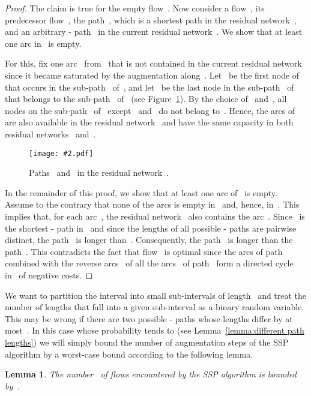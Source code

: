 \documentclass[11pt]{article}
\newtheorem{lemma}[theorem]{Lemma}
\newcommand{\GFX}[2][]{\texttt{[image: \#2.pdf]}}
\newenvironment{fig}
{\begin{figure}[th]\begin{center}}
{\end{center}\end{figure}}
\newenvironment{GFXFIG}[2][]
{\begin{fig}\GFX[#1]{#2}}
{\end{fig}}
\begin{document}
\begin{proof}\renewcommand{\P}{P'}
The claim is true for the empty flow~. Now consider a flow~, its predecessor flow~, the path~, which is a shortest path in the residual network~, and an arbitrary - path~ in the current residual network~. We show that at least one arc in~ is empty.

For this, fix one arc~ from~ that is not contained in the current residual network~ since it became saturated by the augmentation along~. Let~ be the first node of~ that occurs in the sub-path~ of~, and let~ be the last node in the sub-path~ of~ that belongs to the sub-path~ of~ (see Figure~\ref{fig:one empty arc}). By the choice of~ and~, all nodes on the sub-path~ of~ except~ and~ do not belong to~. Hence, the arcs of~ are also available in the residual network~ and have
the same capacity in both residual networks~ and~.

\begin{GFXFIG}[width=0.6\textwidth]{OneEmptyArc}
\caption{Paths~ and~ in the residual network~.}
\label{fig:one empty arc}
\end{GFXFIG}

In the remainder of this proof,
we show that at least one arc of~ is empty. Assume to the contrary
that none of the arcs is empty in~ and, hence, in~. This implies that, for each arc~, the residual network~ also contains the arc~. Since~ is the shortest - path in~ and since the lengths of all possible - paths are pairwise distinct, the path~ is longer than~. Consequently, the path~ is longer than the path~. This contradicts the fact that flow~ is optimal since the arcs of path~ combined with the reverse arcs~ of all the arcs~ of path~ form a directed cycle~ in~ of negative costs. \end{proof}

We want to partition the interval  into small sub-intervals of length~ and treat the number of lengths  that fall into a given sub-interval as a binary random variable. This may be wrong if there are two possible - paths whose lengths differ by at most~. In this case whose probability tends to  (see Lemma~\ref{lemma:different path lengths}) we will simply bound the number of augmentation steps of the SSP algorithm by a worst-case bound according to the following lemma.

\begin{lemma}
\label{lemma:worst case number}
The number~ of flows encountered by the SSP algorithm is bounded by~. 
\end{lemma}
\end{document}
